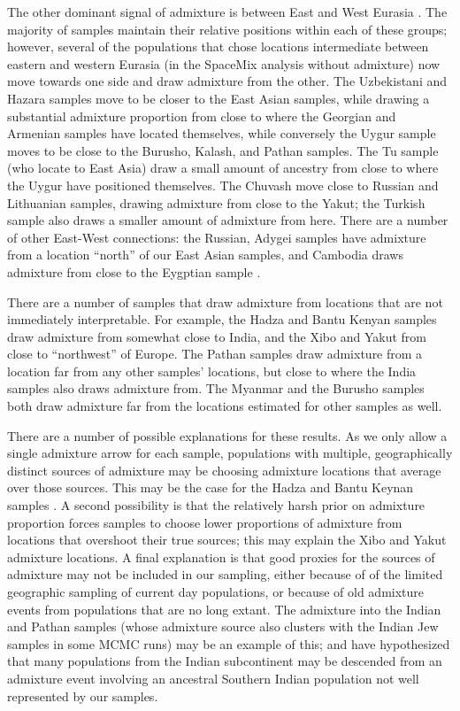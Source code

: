 \documentclass[12pt]{article}
\begin{document}
The other dominant signal of admixture is between East and West Eurasia \citep[a signal documented by many authors:][]{rosenberg_genetic_2002,li_worldwide_2008, xu_genome-wide_2008,Hellenthal}. The majority of samples maintain their relative positions within each of these groups; however, several of the populations that chose locations intermediate between eastern and western Eurasia (in the SpaceMix analysis without admixture) now move towards one side and draw admixture from the other.  The Uzbekistani and Hazara samples move to be closer to the East Asian samples, while drawing a substantial admixture proportion from close to where the Georgian and Armenian samples have located themselves, while conversely the Uygur sample moves to be close to the Burusho, Kalash, and Pathan samples. The Tu sample (who locate to East Asia) draw a small amount of ancestry from close to where the Uygur have positioned themselves. The Chuvash move close to Russian and Lithuanian samples, drawing admixture from close to the Yakut; the Turkish sample also draws a smaller amount of admixture from here. There are a number of other East-West connections: the Russian, Adygei samples have admixture from a location ``north'' of our East Asian samples, and Cambodia draws admixture from close to the Eygptian sample \citep{Treemix, Hellenthal}. 

There are a number of samples that draw admixture from locations that are not immediately interpretable.  For example, the Hadza and Bantu Kenyan samples draw admixture from somewhat close to India, 
and the Xibo and Yakut from close to ``northwest'' of Europe.  
The Pathan samples draw admixture from a location far from any other samples' locations, but close to where the India samples also draws admixture from. 
The Myanmar and the Burusho samples both draw admixture far from the locations estimated for other samples as well.

There are a number of possible explanations for these results. As we only allow a single admixture arrow for each sample, populations with multiple, geographically distinct sources of admixture may be choosing admixture locations that average over those sources. This may be the case for the Hadza and Bantu Keynan samples \citep{Hellenthal}.  A second possibility is that the relatively harsh prior on admixture proportion forces samples to choose lower proportions of admixture from locations that overshoot their true sources; this may explain the Xibo and Yakut admixture locations. A final explanation is that good proxies for the sources of admixture may not be included in our sampling, either because of of the limited geographic sampling of current day populations, or because of old admixture events from populations that are no long extant. The admixture into the Indian and Pathan samples (whose admixture source also clusters with the Indian Jew samples in some MCMC runs) may be an example of this; \citet{reich_india_2009} and \citet{moorjani_india_2013} have hypothesized that many populations from the Indian subcontinent may be descended from an admixture event involving an ancestral Southern Indian population not well represented by our samples. 
\end{document}
